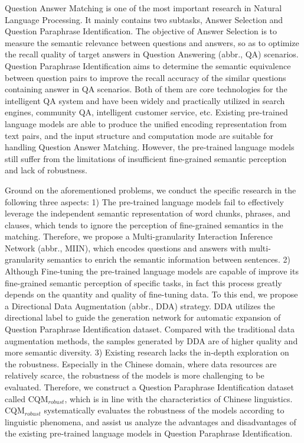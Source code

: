 
\begin{eabstract}

	Question Answer Matching is one of the most important research in Natural Language Processing.
	It mainly contains two subtasks, Answer Selection and Question Paraphrase Identification. 
	The objective of Answer Selection is to measure the semantic relevance between questions and answers, so as to optimize the recall quality of target answers in Question Answering (abbr., QA) scenarios. 
	Question Paraphrase Identification aims to determine the semantic equivalence between question pairs to improve the recall accuracy of the similar questions containing answer in QA scenarios. 
	Both of them are core technologies for the intelligent QA system and have been widely and practically utilized in search engines, community QA, intelligent customer service, etc. 
	Existing pre-trained language models are able to produce the unified encoding representation from text pairs, and the input structure and computation mode are suitable for handling Question Answer Matching. 
	However, the pre-trained language models still suffer from the limitations of insufficient fine-grained semantic perception and lack of robustness.

	Ground on the aforementioned problems, we conduct the specific research in the following three aspects: 
	1) The pre-trained language models fail to effectively leverage the independent semantic representation of word chunks, phrases, and clauses, 
	which tends to ignore the perception of fine-grained semantics in the matching. 
	Therefore, we propose a Multi-granularity Interaction Inference Network (abbr., MIIN),
	which encodes questions and answers with multi-granularity semantics to enrich the semantic information between sentences. 
	2) Although Fine-tuning the pre-trained language models are capable of improve its fine-grained semantic perception of specific tasks, 
	in fact this process greatly depends on the quantity and quality of fine-tuning data. 
	To this end, we propose a Directional Data Augmentation (abbr., DDA) strategy. 
	DDA utilizes the directional label to guide the generation network for automatic expansion of Question Paraphrase Identification dataset. 
	Compared with the traditional data augmentation methods, the samples generated by DDA are of higher quality and more semantic diversity. 
	3) Existing research lacks the in-depth exploration on the robustness.
	Especially in the Chinese domain, where data resources are relatively scarce, 
	the robustness of the models is more challenging to be evaluated. 
	Therefore, we construct a Question Paraphrase Identification dataset called CQM$_{robust}$, which is in line with the characteristics of Chinese linguistics. 
	CQM$_{robust}$ systematically evaluates the robustness of the models according to linguistic phenomena, 
	and assist us analyze the advantages and disadvantages of the existing pre-trained language models in Question Paraphrase Identification.
	

\end{eabstract}
